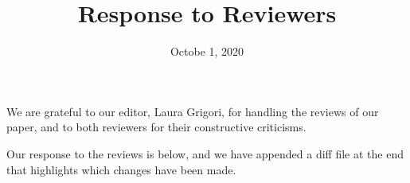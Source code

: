 \documentclass[final,onefignum,onetabnum]{siamart190516}
\begin{document}
\title{Response to Reviewers}
\date{Octobe 1, 2020}
\maketitle
We are grateful to our editor, Laura Grigori, for handling the reviews of our paper, and to both reviewers for their constructive criticisms.

Our response to the reviews is below, and we have appended a diff file at the end that highlights which changes have been made.\\

\end{document}
